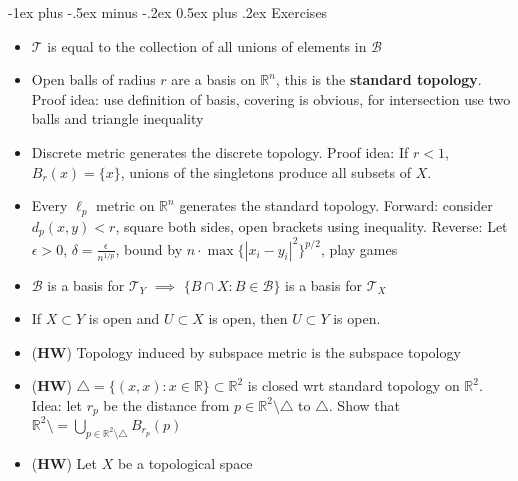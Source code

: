 \documentclass[frenchspacing,9pt,landscape,a4paper]{article}
\makeatletter
\renewcommand{\section}{\@startsection{section}{1}{0mm}%
                                {-1ex plus -.5ex minus -.2ex}%
                                {0.5ex plus .2ex}%
                                {\normalfont\large\bfseries}}
\newcommand{\BR}{\mathbb R}
\newcommand{\abs}[1]{\left\lvert #1 \right\rvert}
\theoremstyle{remark}
\makeatother
\begin{document}
\begin{multicols}{4}
\section{Exercises}
\begin{itemize}
    \item $\mathcal{T}$ is equal to the collection of all unions of elements in  $\mathcal{B}$
    \item Open balls of radius  $r$ are a basis on  $\BR^n$, this is the \textbf{standard topology}. Proof
        idea: use definition of basis, covering is obvious, for intersection use two balls and triangle
        inequality
    \item Discrete metric generates the discrete topology. Proof idea: If $r<1$,  $B_r(x)=\{x\}$, unions of
        the singletons produce all subsets of  $X$.
    \item Every  $\ell_p$ metric on  $\BR^n$ generates the standard topology. Forward: consider
        $d_p(x,y)<r$, square both sides, open brackets using inequality. Reverse: Let $\epsilon>0$,
        $\delta=\frac{\epsilon}{n^{1 /p}}$, bound by $n\cdot\max\{\abs{x_i-y_i}^2\}^{p /2}$, play games
    \item $\mathcal{B}$ is a basis for $\mathcal{T}_Y$  $\implies$  $\{B\cap X:B\in\mathcal{B}\}$ is a
        basis for  $\mathcal{T}_X$
    \item If $X\subset Y$ is open and  $U\subset X$ is open, then  $U\subset Y$ is open.
    \item (\textbf{HW}) Topology induced by subspace metric is the subspace topology
    \item (\textbf{HW}) $\triangle=\{(x,x):x\in\BR\}\subset\BR^2$ is closed wrt standard topology on
        $\BR^2$. Idea: let  $r_p$ be the distance from  $p\in\BR^2\setminus\triangle$ to  $\triangle$. Show
        that  $\BR^2\setminus=\bigcup_{p\in\BR^2\setminus\triangle}B_{r_p}(p)$
    \item (\textbf{HW}) Let $X$ be a topological space
\end{itemize}
\end{multicols}
\end{document}
